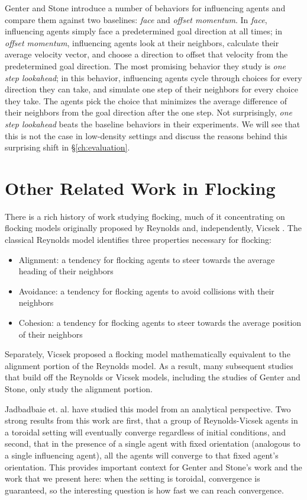 Genter and Stone introduce a number of behaviors for influencing agents and
compare them against two baselines: \textit{face} and \textit{offset momentum}.
In \textit{face}, influencing agents simply face a predetermined goal direction
at all times; in \textit{offset momentum}, influencing agents look at their
neighbors, calculate their average velocity vector, and choose a direction to
offset that velocity from the predetermined goal direction.
The most promising behavior they study is \textit{one step lookahead}; in this
behavior, influencing agents cycle through choices for every direction they
can take, and simulate one step of their neighbors for every choice they take.
The agents pick the choice that minimizes the average difference of their
neighbors from the goal direction after the one step.
Not surprisingly, \textit{one step lookahead} beats the baseline behaviors in
their experiments.
We will see that this is not the case in low-density settings and discuss the
reasons behind this surprising shift in \S\ref{ch:evaluation}.

\section{Other Related Work in Flocking}
There is a rich history of work studying flocking, much of it concentrating on
flocking models originally proposed by Reynolds \cite{reynoldsmodel} and,
independently, Vicsek \cite{vicsek1995}.
The classical Reynolds model identifies three properties necessary for
flocking:
\begin{itemize}
    \item Alignment: a tendency for flocking agents to steer towards the
            average heading of their neighbors
    \item Avoidance: a tendency for flocking agents to avoid collisions with
            their neighbors
    \item Cohesion: a tendency for flocking agents to steer towards the average
            position of their neighbors
\end{itemize}
\noindent Separately, Vicsek proposed a flocking model mathematically
equivalent to the alignment portion of the Reynolds model.
As a result, many subsequent studies that build off the Reynolds or Vicsek
models, including the studies of Genter and Stone, only study the alignment
portion.

Jadbadbaie et. al. \cite{jad2003convergence} have studied this model from an
analytical perspective.
Two strong results from this work are first, that a group of Reynolds-Vicsek
agents in a toroidal setting will eventually converge regardless of initial
conditions, and second, that in the presence of a single agent with fixed
orientation (analogous to a single influencing agent), all the agents will
converge to that fixed agent's orientation.
This provides important context for Genter and Stone's work and the work that
we present here: when the setting is toroidal, convergence is guaranteed, so
the interesting question is how fast we can reach convergence.

